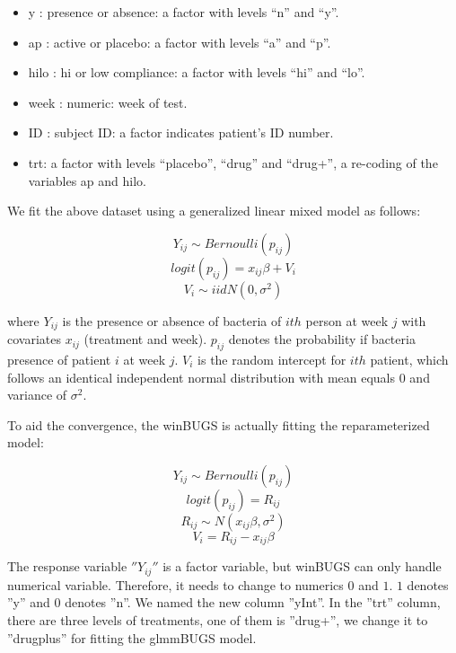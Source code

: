 \documentclass{article}
\begin{document}
\begin{itemize}
\item y : presence or absence: a factor with levels ``n'' and ``y''.
\item ap : active or placebo: a factor with levels ``a'' and ``p''.
\item hilo : hi or low compliance: a factor with levels ``hi'' and ``lo''.
\item week : numeric: week of test. 
\item ID : subject ID: a factor indicates patient's ID number. 
\item trt: a factor with levels ``placebo'', ``drug'' and ``drug+'', a re-coding of the variables ap and hilo.
\end{itemize} 

We fit the above dataset using a generalized linear mixed model as follows:

\[Y_{ij} \sim  Bernoulli(p_{ij})\]
\[logit(p_{ij}) = x_{ij}\beta + V_{i}\]
\[V_{i} \sim iid N(0, \sigma^2)\] 

where $Y_{ij}$ is the presence or absence of bacteria of $ith$ person at week $j$ with covariates $x_{ij}$ (treatment and week).
$p_{ij}$ denotes the probability if bacteria presence of patient $i$ at week $j$.
$V_i$ is the random intercept for $ith$ patient, which follows an identical independent normal distribution with mean equals $0$ and variance of $\sigma^2$.


To aid the convergence, the winBUGS is actually fitting the reparameterized model:

\[Y_{ij} \sim  Bernoulli(p_{ij})\]
\[logit(p_{ij}) = R_{ij}\]
\[R_{ij} \sim N(x_{ij}\beta, \sigma^2)\]
\[V_{i} = R_{ij} - x_{ij}\beta \] 

The response variable $''Y_{ij}''$ is a factor variable, but winBUGS can only handle numerical variable. Therefore, it needs to change to numerics $0$ and $1$. $1$ denotes ''y'' and $0$ denotes ''n''. We named the new column ''yInt''.  In the ''trt'' column, there are three 
levels of treatments, one of them is ''drug+'', we change it to ''drugplus'' for fitting the glmmBUGS model.

\begin{Schunk}
\end{Schunk}
\end{document}
